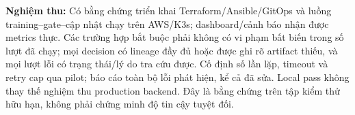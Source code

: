 \textbf{Nghiệm thu:} Có bằng chứng triển khai Terraform/Ansible/GitOps và luồng training--gate--cập nhật chạy trên AWS/K3s; dashboard/cảnh báo nhận được metrics thực. Các trường hợp bắt buộc phải không có vi phạm bất biến trong số lượt đã chạy; mọi decision có lineage đầy đủ hoặc được ghi rõ artifact thiếu, và mọi lượt lỗi có trạng thái/lý do tra cứu được. Cố định số lần lặp, timeout và retry cap qua pilot; báo cáo toàn bộ lỗi phát hiện, kể cả đã sửa. Local pass không thay thế nghiệm thu production backend. Đây là bằng chứng trên tập kiểm thử hữu hạn, không phải chứng minh độ tin cậy tuyệt đối.
